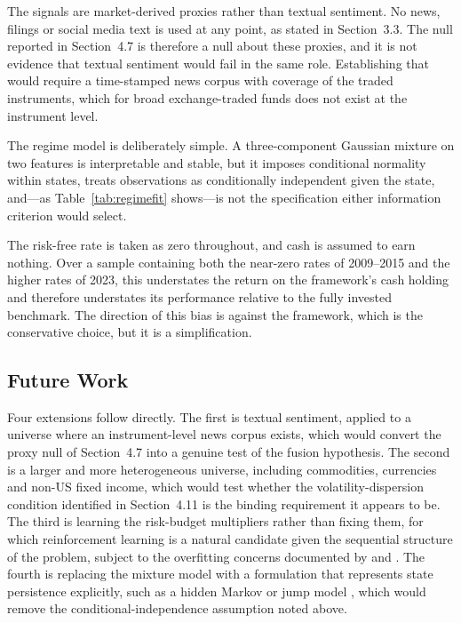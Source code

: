 \documentclass{singlecol-new}
\theoremstyle{TH}{
\newtheorem{lemma}{Lemma}
\newtheorem{theorem}[lemma]{Theorem}
\newtheorem{corrolary}[lemma]{Corrolary}
\newtheorem{conjecture}[lemma]{Conjecture}
\newtheorem{proposition}[lemma]{Proposition}
\newtheorem{claim}[lemma]{Claim}
\newtheorem{stheorem}[lemma]{Wrong Theorem}
\newtheorem{algorithm}{Algorithm}
}
\theoremstyle{THrm}{
\newtheorem{definition}{Definition}[section]
\newtheorem{question}{Question}[section]
\newtheorem{remark}{Remark}
\newtheorem{scheme}{Scheme}
}
\theoremstyle{THhit}{
\newtheorem{case}{Case}[section]
}
\begin{document}
The signals are market-derived proxies rather than textual sentiment. No news, filings
or social media text is used at any point, as stated in Section~3.3. The null reported
in Section~4.7 is therefore a null about these proxies, and it is not evidence that
textual sentiment would fail in the same role. Establishing that would require a
time-stamped news corpus with coverage of the traded instruments, which for broad
exchange-traded funds does not exist at the instrument level.

The regime model is deliberately simple. A three-component Gaussian mixture on two
features is interpretable and stable, but it imposes conditional normality within
states, treats observations as conditionally independent given the state, and---as
Table~\ref{tab:regimefit} shows---is not the specification either information criterion would select.

The risk-free rate is taken as zero throughout, and cash is assumed to earn nothing.
Over a sample containing both the near-zero rates of 2009--2015 and the higher rates of
2023, this understates the return on the framework's cash holding and therefore
understates its performance relative to the fully invested benchmark. The direction of
this bias is against the framework, which is the conservative choice, but it is a
simplification.

\subsection{Future Work}
\label{sec:future}

Four extensions follow directly. The first is textual sentiment, applied to a universe
where an instrument-level news corpus exists, which would convert the proxy null of
Section~4.7 into a genuine test of the fusion hypothesis. The second is a larger and
more heterogeneous universe, including commodities, currencies and non-US fixed income,
which would test whether the volatility-dispersion condition identified in
Section~4.11 is the binding requirement it appears to be. The third is learning the
risk-budget multipliers rather than fixing them, for which reinforcement learning is a
natural candidate given the sequential structure of the problem, subject to the
overfitting concerns documented by \citet{harvey15} and \citet{valls26}. The fourth is
replacing the mixture model with a formulation that represents state persistence
explicitly, such as a hidden Markov or jump model \citep{li25}, which would remove the
conditional-independence assumption noted above.
\end{document}
